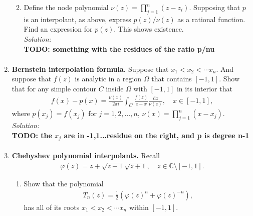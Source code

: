\documentclass[10pt]{amsart}
\newcommand{\D}{\mathrm{d}}
\theoremstyle{nonumberplain}
\begin{document}
\begin{enumerate}[label={\bf {\arabic*}:}]
\begin{enumerate}
\newpage

\item Define the node polynomial $\nu(z) = \prod_{j=1}^n( z - z_i)$.
Supposing that $p$ is an interpolant, as above, express $p(z)/\nu(z)$ as a rational function. 
Find an expression for $p(z)$. This shows existence.\\

\noindent
\textit{Solution:} \\
\textbf{TODO: something with the residues of the ratio p/nu}
\begin{align*}
\end{align*}

\end{enumerate}
\newpage


\item \textbf{Bernstein interpolation formula.}   Suppose that $x_1 < x_2 <
  \cdots x_n$.  And suppose that $f(z)$ is analytic in a region
  $\Omega$ that contains $[-1,1]$.  Show that for any simple contour
  $C$ inside $\Omega$ with $[-1,1]$ in its interior that
  \begin{align*}
    f(x) - p(x) = \frac{\nu(x)}{2 \pi i} \int_C \frac{f(z)}{z - x}
    \frac{\D z}{\nu(z)}, \quad x \in [-1,1],
  \end{align*}
  where $p(x_j) = f(x_j)$ for $j = 1,2,\ldots,n$, $\nu(x) =
  \prod_{j=1}^n (x - x_j)$.\\

\noindent
\textit{Solution:} \\
\textbf{TODO: the $x_j$ are in -1,1...residue on the right, and p is degree n-1}
\begin{align*}
\end{align*}

\newpage


\item  \textbf{Chebyshev polynomial interpolants.}  Recall 
\begin{align*}
\varphi(z) = z + \sqrt{z - 1} \sqrt{z +1}, \quad z \in \mathbb C \setminus [-1,1].
\end{align*}

\begin{enumerate}
\item Show that the polynomial
\begin{align*}
T_n(z) = \frac 1 2 \left( \varphi(z)^n + \varphi(z)^{-n} \right),
\end{align*}
has all of its roots $x_1 < x_2 < \cdots x_n$ within $[-1,1]$. \\


\end{enumerate}
\end{enumerate}
\end{document}
